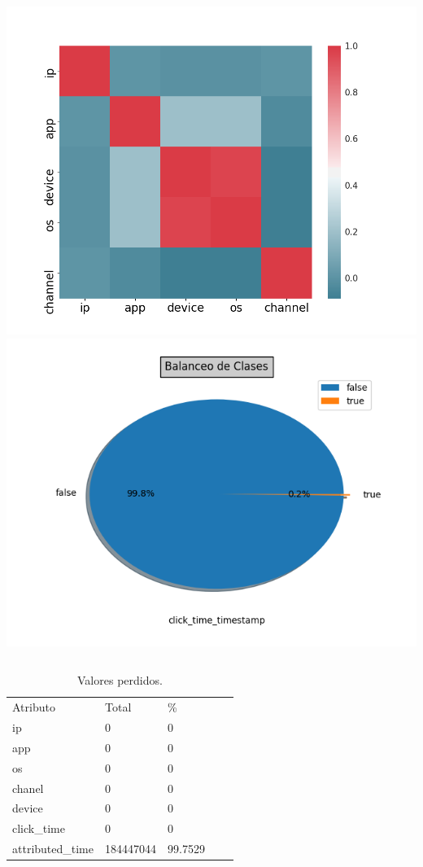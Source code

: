 \documentclass{beamer}
\theoremstyle{plain}
\theoremstyle{definition}
\theoremstyle{plain}
\theoremstyle{definition}
\theoremstyle{remark}
\theoremstyle{definition}
\begin{document}
\begin{frame}
		\begin{columns}[t]
		\includegraphics[scale=0.25]{../img/correlation.png}
	\includegraphics[scale=0.35]{../img/imbalacing.png}
		\end{columns}
	\end{frame}
\begin{frame}
	\begin{table}[H]
		\centering
		\begin{tabular}{lllll}
			Atributo& Total & \%    \\
			ip	& 0 &0 \\
			app	& 0 & 0   \\
			os	& 0 & 0 \\
			chanel &0 & 0 \\
			device & 0 & 0  \\
			click\_time& 0& 0 \\
			attributed\_time &184447044& 99.7529
		\end{tabular}
		\caption{Valores perdidos.}
		\label{}
	\end{table}
	\end{frame}
\end{document}
